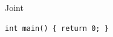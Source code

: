 \documentclass[aspectratio=169,10pt]{beamer}
\begin{document}
\begin{frame}[fragile]{Joint}
	\begin{lstlisting}[file=src/JOINT.cpp]
int main() { return 0; }
	\end{lstlisting}
\end{frame}
\end{document}
